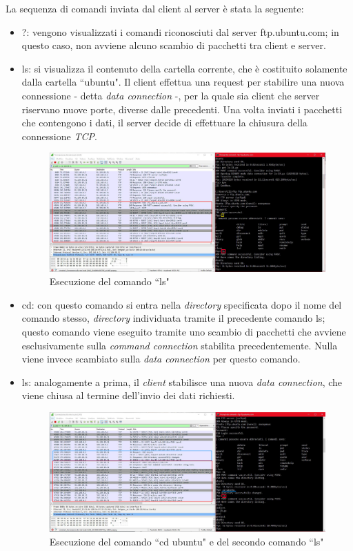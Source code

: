 \documentclass[a4paper, 12pt]{report}
\begin{document}
La sequenza di comandi inviata dal client al server è stata la seguente:
\begin{itemize}
    \item ?: vengono visualizzati i comandi riconosciuti dal server ftp.ubuntu.com; in questo caso, non avviene alcuno scambio di pacchetti tra client e server.
    \item ls: si visualizza il contenuto della cartella corrente, che è costituito solamente dalla cartella ``ubuntu". Il client effettua una request per stabilire una nuova connessione - detta 
    \textit{data connection} -, per la quale sia client che server riservano nuove porte, diverse dalle precedenti. Una volta inviati i pacchetti che contengono i dati, il server decide di effettuare
    la chiusura della connessione \textit{TCP}.

    \begin{figure}[H]
        \centering
        \includegraphics[width=\linewidth]{images/image1_3.png}
        \caption{Esecuzione del comando ``ls"}
    \end{figure}

    \item cd: con questo comando si entra nella \textit{directory} specificata dopo il nome del comando stesso, \textit{directory} individuata tramite il precedente comando ls; questo comando viene eseguito tramite
    uno scambio di pacchetti che avviene esclusivamente sulla \textit{command connection} stabilita precedentemente. Nulla viene invece scambiato sulla \textit{data connection} per questo comando.
    \item ls: analogamente a prima, il \textit{client} stabilisce una nuova \textit{data connection}, che viene chiusa al termine dell’invio dei dati richiesti.
    
    \begin{figure}[H]
        \centering
        \includegraphics[width=\linewidth]{images/image1_4.png}
        \caption{Esecuzione del comando ``cd ubuntu" e del secondo comando ``ls"}
    \end{figure}


\end{itemize}
\end{document}
